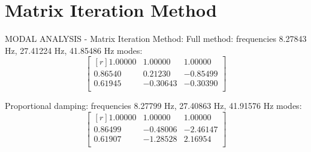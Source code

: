 \section{Matrix Iteration Method}
\label{sec:mim}
MODAL ANALYSIS - Matrix Iteration Method:
Full method:
 frequencies 8.27843 \si{\hertz}, 27.41224 \si{\hertz}, 41.85486 \si{\hertz}
 modes:
 \begin{equation}
\label{eq:mimmodefree}
 \begin{bmatrix*}[r]
	1.00000 & 1.00000 & 1.00000 \\
	0.86540 & 0.21230 &-0.85499 \\
	0.61945 &-0.30643 &-0.30390 \\
	 \end{bmatrix*}
\end{equation}

Proportional damping:
 frequencies 8.27799 \si{\hertz}, 27.40863 \si{\hertz}, 41.91576 \si{\hertz}
 modes:
 \begin{equation}
\label{eq:mimmodeprop}
 \begin{bmatrix*}[r]
	1.00000 & 1.00000 & 1.00000 \\
	0.86499 &-0.48006 &-2.46147 \\
	0.61907 &-1.28528 & 2.16954 \\
	 \end{bmatrix*}
\end{equation}
